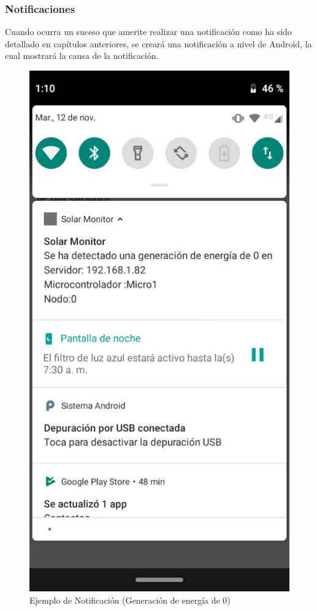 \subsubsection{Notificaciones}\label{Notificaciones}
Cuando ocurra un suceso que amerite realizar una notificación como ha sido detallado en capítulos anteriores, se creará una notificación a nivel de Android, la cual mostrará la causa de la notificación.

\begin{figure}[H]
	\centering
	\includegraphics[scale=0.4]{Capitulo4/software/submodulos/images/man36.png}
	\caption{Ejemplo de Notificación (Generación de energía de 0)}
	\label{fig:Ejemplo de notificacion}
\end{figure}
